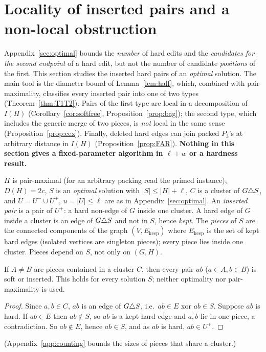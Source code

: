 \section{Locality of inserted pairs and a non-local obstruction}\label{sec:locality}
Appendix~\ref{sec:optimal} bounds the \emph{number} of hard edits and the \emph{candidates for the second endpoint} of a hard edit, but not the number of candidate \emph{positions} of the first. This section studies the inserted hard pairs of an \emph{optimal} solution. The main tool is the diameter bound of Lemma~\ref{lem:half}, which, combined with pair-maximality, classifies every inserted pair into one of two types (Theorem~\ref{thm:T1T2}). Pairs of the first type are local in a decomposition of $I(H)$ (Corollary~\ref{cor:softfree}, Proposition~\ref{prop:bag}); the second type, which includes the generic merge of two pieces, is \emph{not} local in the same sense (Proposition~\ref{prop:cex}). Finally, deleted hard edges can join packed $P_3$'s at arbitrary distance in $I(H)$ (Proposition~\ref{prop:FAR}). \textbf{Nothing in this section gives a fixed-parameter algorithm in $\ell+w$ or a hardness result.}

$H$ is pair-maximal (for an arbitrary packing read the primed instance), $D(H)=2c$, $S$ is an \emph{optimal} solution with $|S|\le|H|+\ell$, $C$ is a cluster of $G\triangle S$, and $U=U^-\cup U^+$, $u=|U|\le\ell$ are as in Appendix~\ref{sec:optimal}. An \emph{inserted pair} is a pair of $U^+$: a hard non-edge of $G$ inside one cluster. A hard edge of $G$ inside a cluster is an edge of $G\triangle S$ and not in $S$, hence \emph{kept}. The \emph{pieces} of $S$ are the connected components of the graph $(V,E_{\mathrm{keep}})$ where $E_{\mathrm{keep}}$ is the set of kept hard edges (isolated vertices are singleton pieces); every piece lies inside one cluster. Pieces depend on $S$, not only on $(G,H)$.
\begin{lemma}\label{lem:cross}
If $A\ne B$ are pieces contained in a cluster $C$, then every pair $ab$ ($a\in A,b\in B$) is soft or inserted. This holds for every solution $S$; neither optimality nor pair-maximality is used.
\end{lemma}
\begin{proof}
Since $a,b\in C$, $ab$ is an edge of $G\triangle S$, i.e.\ $ab\in E$ xor $ab\in S$. Suppose $ab$ is hard. If $ab\in E$ then $ab\notin S$, so $ab$ is a kept hard edge and $a,b$ lie in one piece, a contradiction. So $ab\notin E$, hence $ab\in S$, and as $ab$ is hard, $ab\in U^+$.
\end{proof}
(Appendix~\ref{app:counting} bounds the sizes of pieces that share a cluster.)

